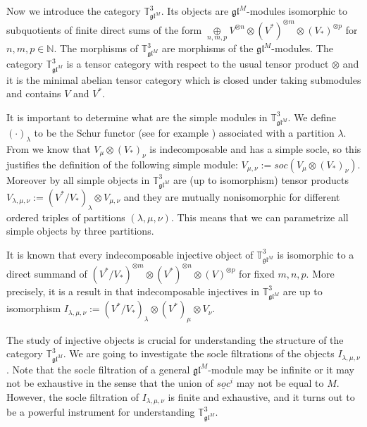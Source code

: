 \documentclass[letterpaper,11pt]{article}
\begin{document}
	Now we introduce the category $\mathbb{T}^3_{\mathfrak{gl}^M}$. Its objects are $\mathfrak{gl}^M$-modules isomorphic to subquotients of finite direct sums of the form $\underset{n,m,p}{\oplus} V^{\otimes n}\otimes (V^*)^{\otimes m} \otimes (V_*)^{\otimes p}$ for $ n,m,p \in \mathbb{N}$. The morphisms of  $\mathbb{T}^3_{\mathfrak{gl}^M}$ are morphisms of the $\mathfrak{gl}^M$-modules. The category $\mathbb{T}^3_{\mathfrak{gl}^M}$ is a tensor category with respect to the usual tensor product $\otimes$ and it is the minimal abelian tensor category which is closed under taking submodules and contains $V$ and $V^*$.
	
	It is important to determine what are the simple modules in $\mathbb{T}^3_{\mathfrak{gl}^M}$. 
	We define $(\cdot)_\lambda$ to be the Schur functor (see for example \cite{fulton-harris}) associated with a partition $\lambda$. From \cite{introduction3} we know that $V_\mu \otimes (V_*)_\nu$ is indecomposable and has a simple socle, so this justifies the definition of the following simple module: $V_{\mu, \nu} := soc(V_\mu \otimes (V_*)_\nu)$. Moreover by \cite{mackey} all simple objects in $\mathbb{T}^3_{\mathfrak{gl}^M}$ are (up to isomorphism) tensor products $V_{\lambda, \mu, \nu} := (V^*/V_*)_\lambda \otimes  V_{\mu, \nu}$ and they are mutually nonisomorphic for different ordered triples of partitions $(\lambda, \mu, \nu)$. This means that we can parametrize all simple objects by three partitions.
	
	It is known that every indecomposable injective object of $\mathbb{T}^3_{\mathfrak{gl}^M}$ is isomorphic to a direct summand of $(V^*/V_*)^{\otimes m} \otimes (V^*) ^{\otimes n} \otimes (V)^{\otimes p}$ for fixed $m,n,p$. More precisely, it is a result in \cite{mackey} that indecomposable injectives in  $\mathbb{T}^3_{\mathfrak{gl}^M}$ are up to isomorphism $I_{\lambda, \mu, \nu} := (V^*/V_*)_\lambda \otimes (V^*)_\mu \otimes V_\nu$. 
		
	The study of injective objects is crucial for understanding the structure of the category  $\mathbb{T}^3_{\mathfrak{gl}^M}$. We are going to investigate the socle filtrations of the objects $I_{\lambda, \mu, \nu}$.  Note that the socle filtration of a general $\mathfrak{gl}^M$-module may be infinite or it may not be exhaustive in the sense that the union of $\underline{soc}^i$ may not be equal to $M$. However, the socle filtration of $I_{\lambda, \mu, \nu}$ is finite and  exhaustive, and it turns out to be a powerful instrument for understanding $\mathbb{T}^3_{\mathfrak{gl}^M}$.
	
\end{document}
